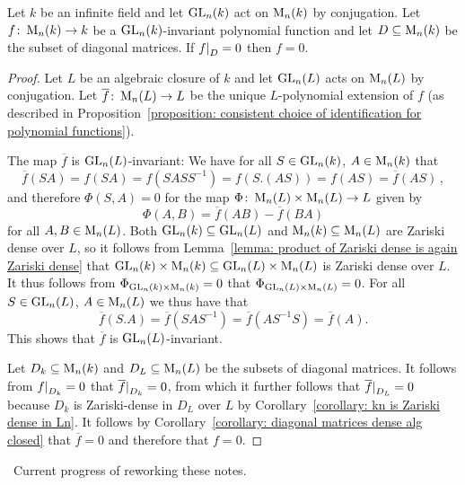 \begin{proposition}
  Let $k$ be an infinite field and let $\operatorname{GL}_n(k)$ act on $\operatorname{M}_n(k)$ by conjugation.
  Let $f \colon \operatorname{M}_n(k) \to k$ be a $\operatorname{GL}_n(k)$-invariant polynomial function and let $D \subseteq \operatorname{M}_n(k)$ be the subset of diagonal matrices.
  If $\restrict{f}{D} = 0$ then $f = 0$.
\end{proposition}
\begin{proof}
  Let $L$ be an algebraic closure of $k$ and let $\operatorname{GL}_n(L)$ acts on $\operatorname{M}_n(L)$ by conjugation.
  Let $\overline{f} \colon \operatorname{M}_n(L) \to L$ be the unique $L$-polynomial extension of $f$ (as described in Proposition~\ref{proposition: consistent choice of identification for polynomial functions}).
  
  The map $\overline{f}$ is $\operatorname{GL}_n(L)$-invariant:
  We have for all $S \in \operatorname{GL}_n(k)$, $A \in \operatorname{M}_n(k)$ that
  \[
      \overline{f}(SA)
    = f(SA)
    = f\left( SASS^{-1} \right)
    = f(S.(AS))
    = f(AS)
    = \overline{f}(AS)  \,,
  \]
  and therefore $\Phi(S,A) = 0$ for the map $\Phi \colon \operatorname{M}_n(L) \times \operatorname{M}_n(L) \to L$ given by
  \[
      \Phi(A,B)
    = \overline{f}(AB) - \overline{f}(BA)
  \]
  for all $A, B \in \operatorname{M}_n(L)$.
  Both $\operatorname{GL}_n(k) \subseteq \operatorname{GL}_n(L)$ and $\operatorname{M}_n(k) \subseteq \operatorname{M}_n(L)$ are Zariski dense over $L$, so it follows from Lemma~\ref{lemma: product of Zariski dense is again Zariski dense} that $\operatorname{GL}_n(k) \times \operatorname{M}_n(k) \subseteq \operatorname{GL}_n(L) \times \operatorname{M}_n(L)$ is Zariski dense over $L$.
  It thus follows from $\Phi_{\operatorname{GL}_n(k) \times \operatorname{M}_n(k)} = 0$ that $\Phi_{\operatorname{GL}_n(L) \times \operatorname{M}_n(L)} = 0$.
  For all $S \in \operatorname{GL}_n(L)$, $A \in \operatorname{M}_n(L)$ we thus have that
  \[
      \overline{f}(S.A)
    = \overline{f}(SAS^{-1})
    = \overline{f}(A S^{-1} S)
    = \overline{f}(A).
  \]
  This shows that $\overline{f}$ is $\operatorname{GL}_n(L)$-invariant.
    
  Let $D_k \subseteq \operatorname{M}_n(k)$ and $D_L \subseteq \operatorname{M}_n(L)$ be the subsets of diagonal matrices.
  It follows from $\restrict{f}{D_k} = 0$ that $\restrict{\overline{f}}{D_k} = 0$, from which it further follows that $\restrict{\overline{f}}{D_L} = 0$ because $D_k$ is Zariski-dense in $D_L$ over $L$ by Corollary~\ref{corollary: kn is Zariski dense in Ln}.
  It follows by Corollary~\ref{corollary: diagonal matrices dense alg closed} that $\overline{f} = 0$ and therefore that $f = 0$.
\end{proof}


\noindent\hrulefill \, Current progress of reworking these notes. \hrulefill





